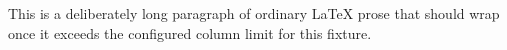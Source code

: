 This is a deliberately long paragraph of ordinary LaTeX prose that should wrap once it exceeds the configured column limit for this fixture.
